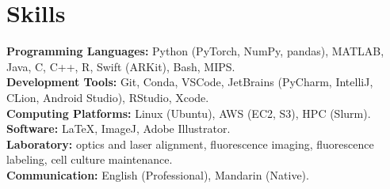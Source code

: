 \documentclass[letterpaper, 11pt]{article}
\newcommand{\subsectionvspace}{\vspace{8pt}}
\begin{document}





\section{Skills}


    \textbf{Programming Languages:} Python (PyTorch, NumPy, pandas), MATLAB, Java, C, C++, R, Swift (ARKit), Bash, MIPS. \\
    \textbf{Development Tools:} Git, Conda, VSCode, JetBrains (PyCharm, IntelliJ, CLion, Android Studio), RStudio, Xcode. \\
    \textbf{Computing Platforms:} Linux (Ubuntu), AWS (EC2, S3), HPC (Slurm). \\
    \textbf{Software:} LaTeX, ImageJ, Adobe Illustrator. \\
    \textbf{Laboratory:} optics and laser alignment, fluorescence imaging, fluorescence labeling, cell culture maintenance. \\
    \textbf{Communication:} English (Professional), Mandarin (Native).
\end{document}

